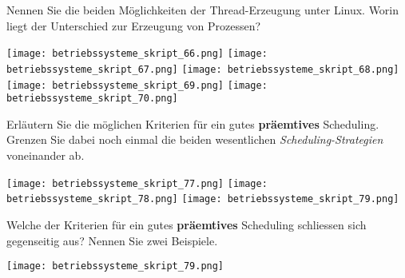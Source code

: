 \documentclass{article}
\begin{document}
\begin{tcolorbox}[colback=white!10!white,colframe=lightgray!75!black,
  savelowerto=\jobname_ex.tex,breakable,enhanced,lines before break=40]

\begin{center}
Nennen Sie die beiden Möglichkeiten der Thread-Erzeugung unter Linux. 
Worin liegt der Unterschied zur Erzeugung von Prozessen?

\end{center}

\tcblower

\justifying
\texttt{[image: betriebssysteme\_skript\_66.png]}
\texttt{[image: betriebssysteme\_skript\_67.png]}
\texttt{[image: betriebssysteme\_skript\_68.png]}
\texttt{[image: betriebssysteme\_skript\_69.png]}
\texttt{[image: betriebssysteme\_skript\_70.png]}

\end{tcolorbox}
\begin{tcolorbox}[colback=white!10!white,colframe=lightgray!75!black,
  savelowerto=\jobname_ex.tex,breakable,enhanced,lines before break=40]

\begin{center}
Erläutern Sie die möglichen Kriterien für ein gutes 
\textbf{präemtives
} Scheduling. Grenzen Sie dabei noch einmal die beiden wesentlichen 
\textit{Scheduling-Strategien
} voneinander ab.

\end{center}

\tcblower

\justifying
\texttt{[image: betriebssysteme\_skript\_77.png]}
\texttt{[image: betriebssysteme\_skript\_78.png]}
\texttt{[image: betriebssysteme\_skript\_79.png]}

\end{tcolorbox}
\begin{tcolorbox}[colback=white!10!white,colframe=lightgray!75!black,
  savelowerto=\jobname_ex.tex,breakable,enhanced,lines before break=40]

\begin{center}
Welche der Kriterien für ein gutes 
\textbf{präemtives
} Scheduling schliessen sich gegenseitig aus? Nennen Sie zwei Beispiele.

\end{center}

\tcblower

\justifying
\texttt{[image: betriebssysteme\_skript\_79.png]}

\end{tcolorbox}
\end{document}
